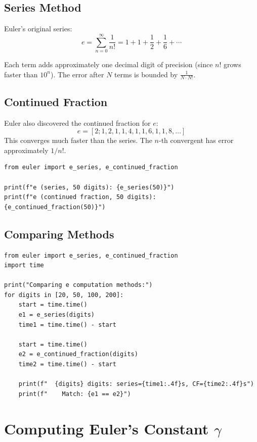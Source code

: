 \subsection{Series Method}

Euler's original series:
\[
e = \sum_{n=0}^{\infty} \frac{1}{n!} = 1 + 1 + \frac{1}{2} + \frac{1}{6} + \cdots
\]

Each term adds approximately one decimal digit of precision (since $n!$ grows faster than $10^n$).
The error after $N$ terms is bounded by $\frac{1}{N \cdot N!}$.

\subsection{Continued Fraction}

Euler also discovered the continued fraction for $e$:
\[
e = [2; 1, 2, 1, 1, 4, 1, 1, 6, 1, 1, 8, \ldots]
\]
This converges much faster than the series. The $n$-th convergent has error approximately $1/n!$.

\begin{lstlisting}[caption={Computing e}, label=lst:compute_e]
from euler import e_series, e_continued_fraction

print(f"e (series, 50 digits): {e_series(50)}")
print(f"e (continued fraction, 50 digits): {e_continued_fraction(50)}")
\end{lstlisting}

\subsection{Comparing Methods}

\begin{lstlisting}[caption={Comparing e computation methods}, label=lst:e_compare]
from euler import e_series, e_continued_fraction
import time

print("Comparing e computation methods:")
for digits in [20, 50, 100, 200]:
    start = time.time()
    e1 = e_series(digits)
    time1 = time.time() - start
    
    start = time.time()
    e2 = e_continued_fraction(digits)
    time2 = time.time() - start
    
    print(f"  {digits} digits: series={time1:.4f}s, CF={time2:.4f}s")
    print(f"    Match: {e1 == e2}")
\end{lstlisting}

\section{Computing Euler's Constant $\gamma$}

